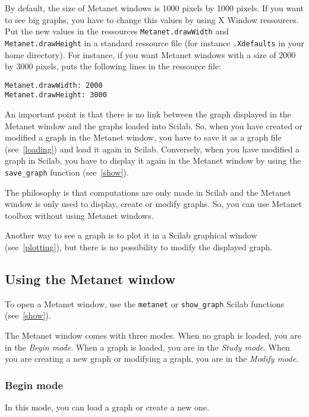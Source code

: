 \documentclass[11pt]{article}
\newcommand{\func}[1]{\texttt{#1}}
\begin{document}
By default, the size of Metanet windows is 1000 pixels by 1000
pixels. If you want to see big graphs, you have to change this values by
using X Window ressources. Put the new values in the ressources
\texttt{Metanet.drawWidth} and \texttt{Metanet.drawHeight} in a
standard ressource file (for instance \texttt{.Xdefaults} in your home
directory). For instance, if you want Metanet windows with a size of
2000 by 3000 pixels, puts the following lines in the ressource file:
\begin{verbatim}
Metanet.drawWidth: 2000
Metanet.drawHeight: 3000
\end{verbatim}

An important point is that there is no link between the graph
displayed in the Metanet window and the graphs loaded into Scilab. So,
when you have created or modified a graph in the Metanet window, you
have to save it as a graph file (see~\ref{loading}) and load it again
in Scilab. Conversely, when you have modified a graph in Scilab, you
have to display it again in the Metanet window by using the
\func{save\_graph} function (see~\ref{show}).

The philosophy is that computations are only made in Scilab and the
Metanet window is only used to display, create or modify graphs. So,
you can use Metanet toolbox without using Metanet windows.

Another way to see a graph is to plot it in a Scilab graphical window
(see~\ref{plotting}), but there is no possibility to modify the
displayed graph.

\subsection{Using the Metanet window}\label{window}

To open a Metanet window, use the \func{metanet} or
\func{show\_graph} Scilab functions (see~\ref{show}).

The Metanet window comes with three modes. When no graph is loaded,
you are in the \emph{Begin mode}. When a graph is loaded, you are in the
\emph{Study mode}. When you are creating a new graph or modifying a graph,
you are in the \emph{Modify mode}.

\subsubsection{Begin mode}

In this mode, you can load a graph or create a new one.
\end{document}
